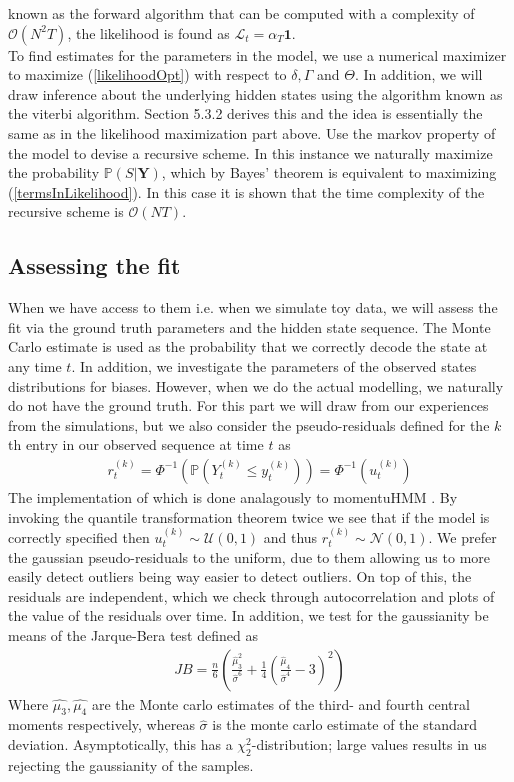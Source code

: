  known as the forward algorithm that can be computed with a complexity of $\mathcal{O}(N^2T)$, the likelihood is found as $\mathcal{L}_t = \alpha_T\mathbf{1}$.\\ To find estimates for the parameters in the model, we use a numerical maximizer to maximize (\ref{likelihoodOpt}) with respect to $\delta, \Gamma$ and $\Theta$. In addition, we will draw inference about the underlying hidden states using the algorithm known as the viterbi algorithm. Section 5.3.2 \cite{HHMForTimesSeries}  derives this and the idea is essentially the same as in the likelihood maximization part above. Use the markov property of the model to devise a recursive scheme. In this instance we naturally maximize the probability $\mathbb{P}(S | \mathbf{Y})$, which by Bayes' theorem is equivalent to maximizing (\ref{termsInLikelihood}). In this case it is shown that the time complexity of the recursive scheme is $\mathcal{O}(NT)$. \cite{HHMForTimesSeries}
\subsection{Assessing the fit}
When we have access to them i.e. when we simulate toy data, we will assess the fit via the ground truth parameters and the hidden state sequence. The Monte Carlo estimate is used as the probability that we correctly decode the state at any time $t$. In addition, we investigate the parameters of the observed states distributions for biases. However, when we do the actual modelling, we naturally do not have the ground truth. For this part we will draw from our experiences from the simulations, but we also consider the pseudo-residuals defined for the $k$th entry in our observed sequence at time $t$ as \cite{HHMForTimesSeries}
\begin{align}
    r_t^{(k)} = \Phi^{-1}\left(\mathbb{P}\left(Y_t^{(k)} \leq y_t^{(k)}\right)\right) = \Phi^{-1}\left(u_t^{(k)}\right)
\end{align}
The implementation of which is done analagously to momentuHMM \cite{momentuHMM}.
By invoking the quantile transformation theorem twice we see that if the model is correctly specified then $u_t^{(k)}\sim \mathcal{U}(0,1)$ and thus $r_t^{(k)}\sim\mathcal{N}\left(0,1\right)$. We prefer the gaussian pseudo-residuals to the uniform, due to them allowing us to more easily detect outliers being way easier to detect outliers. On top of this, the residuals are independent, which we check through autocorrelation and plots of the value of the residuals over time. In addition, we test for the gaussianity be means of the Jarque-Bera test defined as
\begin{align}
    JB = \frac{n}{6}\left(\frac{\hat{\mu}_3^2}{\hat{\sigma}^6}+\frac{1}{4}\left(\frac{\hat{\mu}_4}{\hat{\sigma}^4}-3\right)^2\right)
\end{align}
Where $\hat{\mu_3}, \hat{\mu_4}$ are the Monte carlo estimates of the third- and fourth central moments respectively, whereas $\hat{\sigma}$ is the monte carlo estimate of the standard deviation. Asymptotically, this has a $\chi_2^2$-distribution; large values results in us rejecting the gaussianity of the samples.\cite{tseries}
